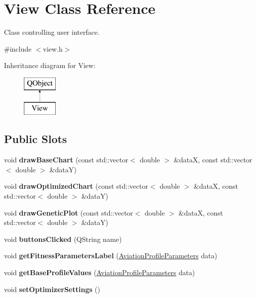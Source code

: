 \hypertarget{class_view}{}\section{View Class Reference}
\label{class_view}


Class controlling user interface.  




{\ttfamily \#include $<$view.\+h$>$}

Inheritance diagram for View\+:\begin{figure}[H]
\begin{center}
\leavevmode
\includegraphics[height=2.000000cm]{class_view}
\end{center}
\end{figure}
\subsection*{Public Slots}
\begin{DoxyCompactItemize}
\item 
\hypertarget{class_view_ae947cd6d87306563e8827d80448c1f28}{}\label{class_view_ae947cd6d87306563e8827d80448c1f28} 
void {\bfseries draw\+Base\+Chart} (const std\+::vector$<$ double $>$ \&dataX, const std\+::vector$<$ double $>$ \&dataY)
\item 
\hypertarget{class_view_ad0df9f601ff799e4555e4662e1b0352c}{}\label{class_view_ad0df9f601ff799e4555e4662e1b0352c} 
void {\bfseries draw\+Optimized\+Chart} (const std\+::vector$<$ double $>$ \&dataX, const std\+::vector$<$ double $>$ \&dataY)
\item 
\hypertarget{class_view_a81a7e65b2a53ad30ce94b42c214dc3ef}{}\label{class_view_a81a7e65b2a53ad30ce94b42c214dc3ef} 
void {\bfseries draw\+Genetic\+Plot} (const std\+::vector$<$ double $>$ \&dataX, const std\+::vector$<$ double $>$ \&dataY)
\item 
\hypertarget{class_view_a717cea2de9e99ba58fe35a574bb56554}{}\label{class_view_a717cea2de9e99ba58fe35a574bb56554} 
void {\bfseries buttons\+Clicked} (Q\+String name)
\item 
\hypertarget{class_view_a2291d8c957e0095b57d76bb247d6a915}{}\label{class_view_a2291d8c957e0095b57d76bb247d6a915} 
void {\bfseries get\+Fitness\+Parameters\+Label} (\hyperlink{struct_aviation_profile_parameters}{Aviation\+Profile\+Parameters} data)
\item 
\hypertarget{class_view_a47d43d8644c74f17993a4ce2754e5be7}{}\label{class_view_a47d43d8644c74f17993a4ce2754e5be7} 
void {\bfseries get\+Base\+Profile\+Values} (\hyperlink{struct_aviation_profile_parameters}{Aviation\+Profile\+Parameters} data)
\item 
\hypertarget{class_view_a2556a1b48f4c638f752b5e22e6044adb}{}\label{class_view_a2556a1b48f4c638f752b5e22e6044adb} 
void {\bfseries set\+Optimizer\+Settings} ()
\end{DoxyCompactItemize}
